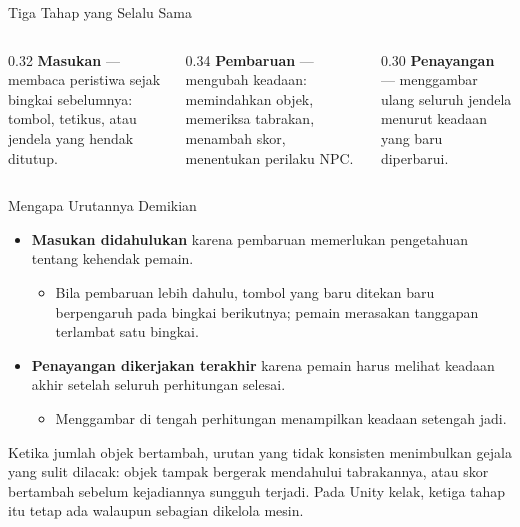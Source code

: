 \documentclass[aspectratio=169,10pt]{beamer}
\begin{document}
\begin{frame}{Tiga Tahap yang Selalu Sama}
\centering
{}
\vspace{0.10cm}
\begin{columns}[T,onlytextwidth]
  \begin{column}{0.32\textwidth}
    {\scriptsize\textbf{Masukan} --- membaca peristiwa sejak bingkai
     sebelumnya: tombol, tetikus, atau jendela yang hendak ditutup.}
  \end{column}
  \begin{column}{0.34\textwidth}
    {\scriptsize\textbf{Pembaruan} --- mengubah keadaan: memindahkan objek,
     memeriksa tabrakan, menambah skor, menentukan perilaku NPC.}
  \end{column}
  \begin{column}{0.30\textwidth}
    {\scriptsize\textbf{Penayangan} --- menggambar ulang seluruh jendela
     menurut keadaan yang baru diperbarui.}
  \end{column}
\end{columns}
\end{frame}

\begin{frame}{Mengapa Urutannya Demikian}
\begin{itemize}
  \item \textbf{Masukan didahulukan} karena pembaruan memerlukan pengetahuan
        tentang kehendak pemain.
        \begin{itemize}
          \item Bila pembaruan lebih dahulu, tombol yang baru ditekan baru
                berpengaruh pada bingkai berikutnya; pemain merasakan tanggapan
                terlambat satu bingkai.
        \end{itemize}
  \item \textbf{Penayangan dikerjakan terakhir} karena pemain harus melihat
        keadaan akhir setelah seluruh perhitungan selesai.
        \begin{itemize}
          \item Menggambar di tengah perhitungan menampilkan keadaan setengah
                jadi.
        \end{itemize}
\end{itemize}
\begin{kotak}
Ketika jumlah objek bertambah, urutan yang tidak konsisten menimbulkan gejala
yang sulit dilacak: objek tampak bergerak mendahului tabrakannya, atau skor
bertambah sebelum kejadiannya sungguh terjadi. Pada Unity kelak, ketiga tahap
itu tetap ada walaupun sebagian dikelola mesin.
\end{kotak}
\end{frame}
\end{document}
